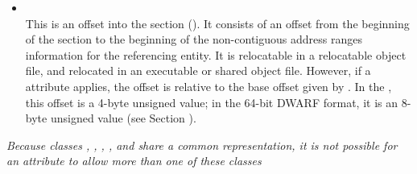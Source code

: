 \begin{itemize}
\item {} \\
This is an 
offset into the \dotdebugranges{} section
(\DWFORMsecoffset). 
It consists of an
offset from the beginning of the 
\dotdebugranges{} section
to the beginning of the non-contiguous address ranges
information for the referencing entity.  
It is relocatable in
a relocatable object file, and relocated in an executable or
shared object file. 
However, if a \DWATrangesbase{} attribute applies, the offset
is relative to the base offset given by \DWATrangesbase.
In the \thirtytwobitdwarfformat, this offset
is a 4-byte unsigned value; in the 64-bit DWARF
format, it is an 8-byte unsigned value (see Section
).
\end{itemize}

\textit{Because classes
\CLASSaddrptr, 
\CLASSlineptr, 
\CLASSloclistptr, 
\CLASSmacptr, 
\CLASSrangelistptr{} and
\CLASSstroffsetsptr{}
share a common representation, it is not possible for an
attribute to allow more than one of these classes}


